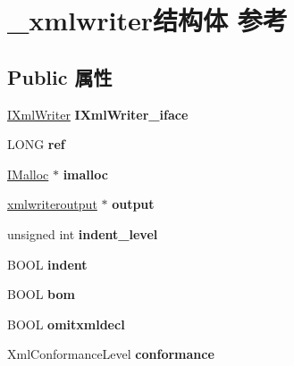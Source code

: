 \hypertarget{struct__xmlwriter}{}\section{\+\_\+xmlwriter结构体 参考}
\label{struct__xmlwriter}
\subsection*{Public 属性}
\begin{DoxyCompactItemize}
\item 
\mbox{\label{struct__xmlwriter_a47e45e947eddc5f46f8726eaff164a5e}} 
\hyperlink{interface_i_xml_writer}{I\+Xml\+Writer} {\bfseries I\+Xml\+Writer\+\_\+iface}
\item 
\mbox{\label{struct__xmlwriter_a4adc53fbacc2302c5254b84449df52a1}} 
L\+O\+NG {\bfseries ref}
\item 
\mbox{\label{struct__xmlwriter_ad79f720f53f59acd88640e873119427a}} 
\hyperlink{interface_i_malloc}{I\+Malloc} $\ast$ {\bfseries imalloc}
\item 
\mbox{\label{struct__xmlwriter_a01c0a0073618f01d51522aa620dbe8ea}} 
\hyperlink{structxmlwriteroutput}{xmlwriteroutput} $\ast$ {\bfseries output}
\item 
\mbox{\label{struct__xmlwriter_a034dabedd603d5ad70ef45306b6084c4}} 
unsigned int {\bfseries indent\+\_\+level}
\item 
\mbox{\label{struct__xmlwriter_af4f5a8ba7a40cd71cc2e37174af5e219}} 
B\+O\+OL {\bfseries indent}
\item 
\mbox{\label{struct__xmlwriter_abd13e93a30ab33231786b84d8834df59}} 
B\+O\+OL {\bfseries bom}
\item 
\mbox{\label{struct__xmlwriter_a2894366de6dd8e5ca2e72c5a5b009cbf}} 
B\+O\+OL {\bfseries omitxmldecl}
\item 
\mbox{\label{struct__xmlwriter_a84c544dc5c349060ff3ffe55c21b2e8d}} 
Xml\+Conformance\+Level {\bfseries conformance}

\end{DoxyCompactItemize}
